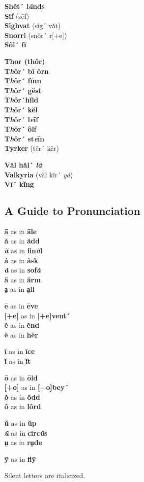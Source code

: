 \begin{multicols}{3}
\noindent\textbf{Shĕt´ l\emph{ă}nds}\\
\textbf{Sif} (sēf)\\
\textbf{Sighvat} (sĭg´ văt)\\
\textbf{Snorri} (snŏr´ r{[}+e{]})\\
\textbf{Sôl´ fĭ}

\noindent\textbf{Thor (thôr)}\\
\textbf{T\emph{h}ôr´ bĭ ôrn}\\
\textbf{T\emph{h}ôr´ fĭnn}\\
\textbf{T\emph{h}ôr´ gĕst}\\
\textbf{T\emph{h}ôr´hĭld}\\
\textbf{T\emph{h}ôr´ kĕl}\\
\textbf{T\emph{h}ôr´ l\emph{e}īf}\\
\textbf{T\emph{h}ôr´ ôlf}\\
\textbf{T\emph{h}ôr´ st\emph{e}īn}\\
\textbf{Tyrker} (tẽr´ kẽr)

\noindent\textbf{Văl hăl´ \emph{lȧ}}\\
\textbf{Valkyria} (văl kĭr´ \emph{yȧ})\\
\textbf{Vī´ kĭng}
\end{multicols}

\subsection*{A Guide to Pronunciation}

\begin{multicols}{3}
\noindent\textbf{ā} as in \textbf{āle}\\
\textbf{ă} as in \textbf{ădd}\\
\textbf{\emph{ă}} as in \textbf{fin\emph{ă}l}\\
\textbf{ȧ} as in \textbf{ȧsk}\\
\textbf{\emph{ȧ}} as in \textbf{sof\emph{ȧ}}\\
\textbf{ä} as in \textbf{ärm}\\
\textbf{a̤} as in \textbf{a̤ll}

\noindent\textbf{ē} as in \textbf{ēve}\\
\textbf{{[}+e{]}} as in \textbf{{[}+e{]}vent´}\\
\textbf{ĕ} as in \textbf{ĕnd}\\
\textbf{ẽ} as in \textbf{hẽr}

\noindent\textbf{ī} as in \textbf{īce}\\
\textbf{ĭ} as in \textbf{ĭt}

\noindent\textbf{ō} as in \textbf{ōld}\\
\textbf{{[}+o{]}} as in \textbf{{[}+o{]}bey´}\\
\textbf{ŏ} as in \textbf{ŏdd}\\
\textbf{ô} as in \textbf{lôrd}

\noindent\textbf{ŭ} as in \textbf{ŭp}\\
\textbf{\emph{ŭ}} as in \textbf{circ\emph{ŭ}s}\\
\textbf{ṳ} as in \textbf{rṳde}

\noindent\textbf{ȳ} as in \textbf{flȳ}
\end{multicols}

\noindent Silent letters are italicized.

